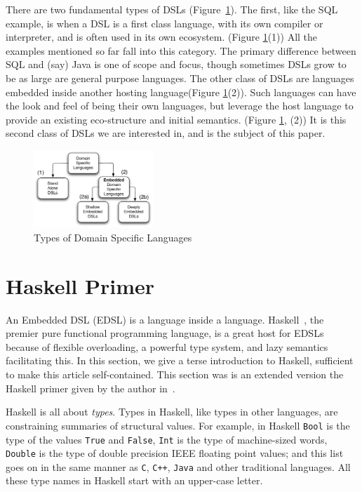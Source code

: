 \documentclass[11pt]{article}
\begin{document}
There are two fundamental types of DSLs
(Figure~\ref{fig:types-of-dsls}).
%
The first, like the SQL example, is when a DSL is a first class language,
with its own compiler or interpreter, and is often used in
its own ecosystem. (Figure \ref{fig:types-of-dsls}(1)) 
All the examples mentioned so far fall
into this category. The primary difference between SQL and
(say) Java is one of scope and focus, though sometimes
DSLs grow to be as large are general purpose languages.
%
The other class of DSLs are languages
embedded inside another hosting language(Figure \ref{fig:types-of-dsls}(2)). 
Such languages
can have the look and feel of being their own languages,
but leverage the host language to provide an existing
eco-structure and initial semantics. 
(Figure \ref{fig:types-of-dsls}, (2))
It is this second
class of DSLs we are interested in, and is the subject of
this paper.

\begin{figure}[!t]
  \centering        
  \includegraphics[width=0.4\textwidth]{images/TypesOfDSLs.pdf}
  \caption{Types of Domain Specific Languages}
  \label{fig:types-of-dsls}
\end{figure}
        
\section{Haskell Primer}

An Embedded DSL (EDSL) is a language inside a language.
Haskell~\cite{Haskell98Book}, the premier pure functional programming language, is a great host for EDSLs
because of flexible overloading, a powerful type system, and lazy semantics facilitating this.
In this section, we give a terse
introduction to Haskell, 
sufficient to make this article self-contained. This section was
is an extended version the Haskell primer given by the author in~\cite{Gill:11:Declarative}.

Haskell is all about {\em types\/}. Types in Haskell, like
types in other languages, are constraining summaries of structural values.
For example, in Haskell \verb|Bool| is the type of the values
\verb|True| and \verb|False|, \verb|Int| is the type of machine-sized
words, \verb|Double| is the type of double precision IEEE floating
point values; and this list goes on in the same manner as
\verb|C|, \verb|C++|, \verb|Java| and other traditional languages.
All these type names in Haskell start with an upper-case letter.
\end{document}
